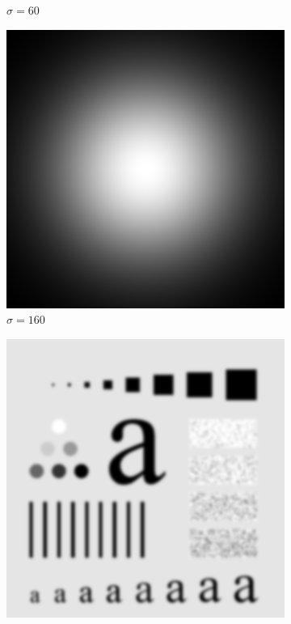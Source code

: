 \documentclass[
	12pt, %
]{style/fphw}
\begin{document}
\begin{figure}[H]
\begin{subfigure}[b]{.3\textwidth}
         \caption{$\sigma=60$}
         \label{Q5_2_lowpass_filter_60}
     \end{subfigure}
     \hfill
     \begin{subfigure}[b]{.3\textwidth}
         \centering
         \includegraphics[width=\textwidth]{plots2/Q5_2_lowpass_filter_160.png}
         \caption{$\sigma=160$}
         \label{Q5_2_lowpass_filter_160}
     \end{subfigure}
     \vfill
     \begin{subfigure}[b]{.3\textwidth}
         \centering
         \includegraphics[width=\textwidth]{plots2/Q5_2_lowpass_30.png}

\end{subfigure}
\end{figure}
\end{document}

